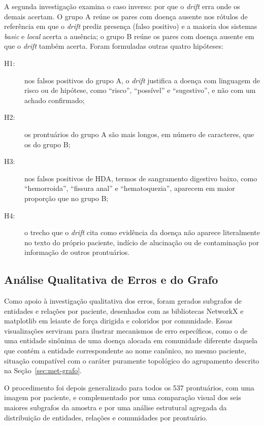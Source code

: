 A segunda investigação examina o caso inverso: por que o \textit{drift} erra onde os demais acertam. O grupo A reúne os pares com doença ausente nos rótulos de referência em que o \textit{drift} prediz presença (falso positivo) e a maioria dos sistemas \textit{basic} e \textit{local} acerta a ausência; o grupo B reúne os pares com doença ausente em que o \textit{drift} também acerta. Foram formuladas outras quatro hipóteses:
\begin{description}
    \item[H1:] nos falsos positivos do grupo A, o \textit{drift} justifica a doença com linguagem de risco ou de hipótese, como ``risco'', ``possível'' e ``sugestivo'', e não com um achado confirmado;
    \item[H2:] os prontuários do grupo A são mais longos, em número de caracteres, que os do grupo B;
    \item[H3:] nos falsos positivos de HDA, termos de sangramento digestivo baixo, como ``hemorroida'', ``fissura anal'' e ``hematoquezia'', aparecem em maior proporção que no grupo B;
    \item[H4:] o trecho que o \textit{drift} cita como evidência da doença não aparece literalmente no texto do próprio paciente, indício de alucinação ou de contaminação por informação de outros prontuários.
\end{description}

\subsection{Análise Qualitativa de Erros e do Grafo}\label{sec:met-qualitativa}

Como apoio à investigação qualitativa dos erros, foram gerados subgrafos de entidades e relações por paciente, desenhados com as bibliotecas NetworkX e matplotlib em leiaute de força dirigida e coloridos por comunidade.
Essas visualizações serviram para ilustrar mecanismos de erro específicos, como o de uma entidade sinônima de uma doença alocada em comunidade diferente daquela que contém a entidade correspondente ao nome canônico, no mesmo paciente, situação compatível com o caráter puramente topológico do agrupamento descrito na Seção~\ref{sec:met-grafo}.

O procedimento foi depois generalizado para todos os 537 prontuários, com uma imagem por paciente, e complementado por uma comparação visual dos seis maiores subgrafos da amostra e por uma análise estrutural agregada da distribuição de entidades, relações e comunidades por prontuário.
